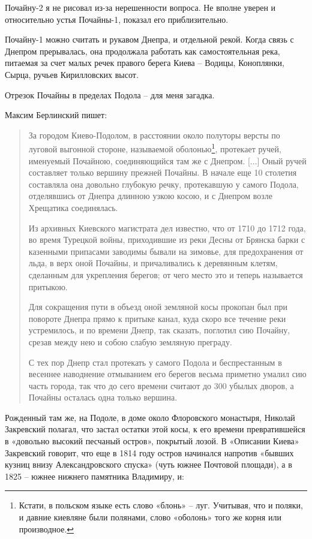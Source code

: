 Почайну-2 я не рисовал из-за нерешенности вопроса. Не вполне уверен и относительно устья Почайны-1, показал его приблизительно.

Почайну-1 можно считать и рукавом Днепра, и отдельной рекой. Когда связь с Днепром прерывалась, она продолжала работать как самостоятельная река, питаемая за счет малых речек правого берега Киева – Водицы, Коноплянки, Сырца, ручьев Кирилловских высот.

Отрезок Почайны в пределах Подола – для меня загадка. 

Максим Берлинский пишет\cite{berl01}:

\begin{quotation}
За городом Киево-Подолом, в расстоянии около полуторы версты по луговой выгонной стороне, называемой оболонью\footnote{Кстати, в польском языке есть слово «блонь» –  луг. Учитывая, что и поляки, и давние киевляне были полянами, слово «оболонь» того же корня или производное.}, протекает ручей, именуемый Почайною, соединяющийся там же с Днепром. [...] Оный ручей составляет только вершину прежней Почайны. В начале еще 10 столетия составляла  она довольно глубокую речку, протекавшую у самого Подола, отделявшись от Днепра длинною узкою косою, и с Днепром возле Хрещатика соединялась. 

Из архивных Киевского магистрата дел известно, что от 1710 до 1712 года, во время Турецкой войны, приходившие из реки Десны от Брянска барки с казенными припасами заводимы бывали на зимовье, для предохранения от льда, в верх оной Почайны, и причаливались к деревянным клетям, сделанным для укрепления берегов; от чего место это и теперь называется притыкою.

Для сокращения пути в объезд оной земляной косы прокопан был при повороте Днепра прямо к притыке канал, куда скоро все течение реки устремилось, и по времени Днепр, так сказать, поглотил сию Почайну, срезав между нею и собою слабую земляную преграду. 

С тех пор Днепр стал протекать у самого Подола и беспрестанным в весеннее наводнение отмыванием его берегов весьма приметно умалил сию часть города, так что до сего времени считают до 300 убылых дворов, а Почайны осталась одна только вершина.
\end{quotation}

Рожденный там же, на Подоле, в доме около Флоровского монастыря, Николай Закревский полагал, что застал остатки этой косы, к его времени превратившейся в «довольно высокий песчаный остров», покрытый лозой. В «Описании Киева»\cite{zakr01} Закревский говорит, что еще в 1814 году остров начинался напротив «бывших кузниц внизу Александровского спуска» (чуть южнее Почтовой площади), а в 1825 – южнее нижнего памятника Владимиру, и:

